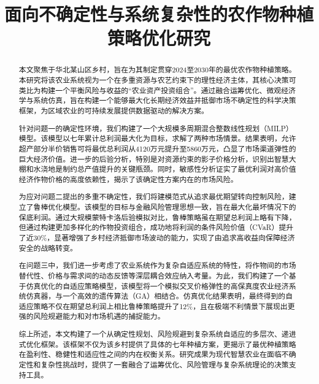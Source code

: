 \documentclass[withoutpreface,bwprint]{cumcmthesis} %
\title{面向不确定性与系统复杂性的农作物种植策略优化研究}
\begin{document}
\maketitle
\begin{abstract}

本文聚焦于华北某山区乡村，旨在为其制定贯穿2024至2030年的最优农作物种植策略。本研究将该农业系统视为一个在多重资源与农艺约束下的理性经济主体，其核心决策可类比为构建一个平衡风险与收益的“农业资产投资组合”。通过融合运筹优化、微观经济学与系统仿真，旨在构建一个能够最大化长期经济效益并抵御市场不确定性的科学决策框架，为区域农业的可持续发展提供数据驱动的解决方案。

针对问题一的确定性环境，我们构建了一个大规模多周期混合整数线性规划（MILP）模型。该模型以七年累计总利润最大化为目标，求解了两种市场情景。结果表明，允许超产部分半价销售可将最优总利润从4120万元提升至5860万元，凸显了市场渠道弹性的巨大经济价值。进一步的后验分析，特别是对资源约束的影子价格分析，识别出智慧大棚和水浇地是制约总产值提升的关键瓶颈。同时，敏感性分析证实了最优利润对高价值经济作物价格的高度依赖性，揭示了该确定性方案内在的市场风险。



	为应对问题二提出的多重不确定性，我们将建模范式从追求最优期望转向控制风险，建立了鲁棒优化模型。该模型的目标与金融风险管理思想一致，旨在最大化最坏情况下的保底利润。通过大规模蒙特卡洛后验模拟对比，鲁棒策略虽在期望总利润上略有下降，但通过构建更加多样化的作物投资组合，成功地将利润的条件风险价值（CVaR）提升了近30\%，显著增强了乡村经济抵御市场波动的能力，实现了由追求高收益向保障经济安全的战略转变。

	在问题三中，我们进一步考虑了农业系统作为复杂自适应系统的特性，将作物间的市场替代性、价格与需求间的动态反馈等深层耦合效应纳入考量。为此，我们构建了一个基于仿真优化的自适应策略模型，该模型将一个模拟交叉价格弹性的高保真度农业经济系统仿真器，与一个高效的遗传算法（GA）相结合。仿真优化结果表明，最终得到的自适应策略不仅在期望总利润上相比鲁棒策略提升了12\%，且在极端不利情景下展现出更强的风险规避能力和对市场机遇的捕捉能力。

	综上所述，本文构建了一个从确定性规划、风险规避到复杂系统自适应的多层次、递进式优化框架。该框架不仅为该乡村提供了具体的七年种植方案，更揭示了最优种植策略在盈利性、稳健性和适应性之间的内在权衡关系。研究成果为现代智慧农业在面临不确定性和复杂性挑战时，提供了一套融合了运筹优化、风险管理与复杂系统理论的决策支持工具。

\end{abstract}
\end{document}
